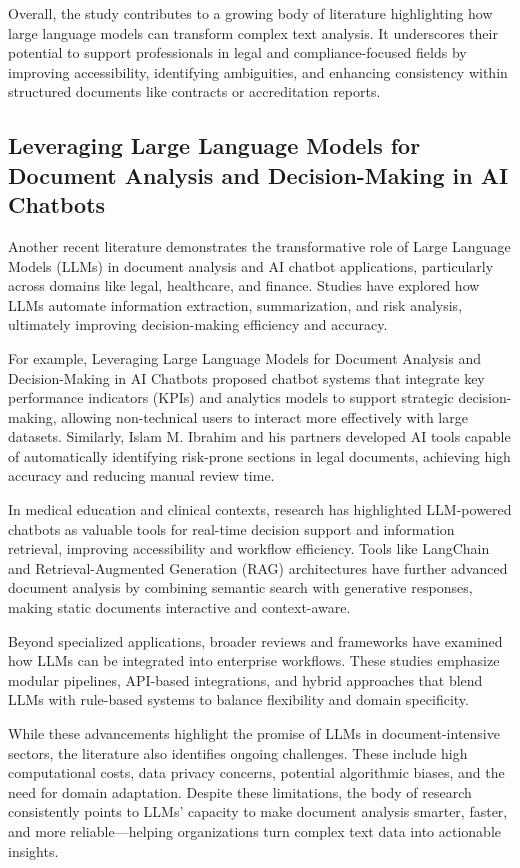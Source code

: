Overall, the study contributes to a growing body of literature highlighting how large language models can transform complex text analysis. It underscores their potential to support professionals in legal and compliance-focused fields by improving accessibility, identifying ambiguities, and enhancing consistency within structured documents like contracts or accreditation reports.

\subsection{Leveraging Large Language Models for Document Analysis and Decision-Making in AI Chatbots}

Another recent literature demonstrates the transformative role of Large Language Models (LLMs) in document analysis and AI chatbot applications, particularly across domains like legal, healthcare, and finance. Studies have explored how LLMs automate information extraction, summarization, and risk analysis, ultimately improving decision-making efficiency and accuracy.

For example, Leveraging Large Language Models for Document Analysis and Decision-Making in AI Chatbots\cite{islam} proposed chatbot systems that integrate key performance indicators (KPIs) and analytics models to support strategic decision-making, allowing non-technical users to interact more effectively with large datasets. Similarly, Islam M. Ibrahim and his partners developed AI tools capable of automatically identifying risk-prone sections in legal documents, achieving high accuracy and reducing manual review time.

In medical education and clinical contexts, research has highlighted LLM-powered chatbots as valuable tools for real-time decision support and information retrieval, improving accessibility and workflow efficiency. Tools like LangChain and Retrieval-Augmented Generation (RAG) architectures have further advanced document analysis by combining semantic search with generative responses, making static documents interactive and context-aware.

Beyond specialized applications, broader reviews and frameworks have examined how LLMs can be integrated into enterprise workflows. These studies emphasize modular pipelines, API-based integrations, and hybrid approaches that blend LLMs with rule-based systems to balance flexibility and domain specificity.

While these advancements highlight the promise of LLMs in document-intensive sectors, the literature also identifies ongoing challenges. These include high computational costs, data privacy concerns, potential algorithmic biases, and the need for domain adaptation. Despite these limitations, the body of research consistently points to LLMs’ capacity to make document analysis smarter, faster, and more reliable—helping organizations turn complex text data into actionable insights.

